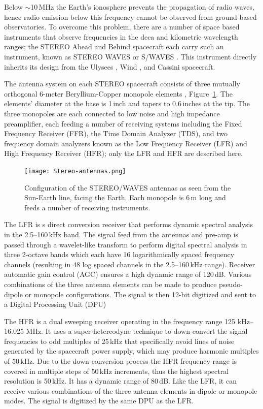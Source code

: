 Below $\sim$10\,MHz the Earth's ionosphere prevents the propagation of radio waves, hence radio emission below this frequency cannot be observed from ground-based observatories. To overcome this problem, there are a number of space based instruments that observe frequencies in the deca and kilometric wavelength ranges; the STEREO Ahead and Behind spacecraft each carry such an instrument, known as STEREO WAVES or S/WAVES \citep{bougeret2008}. This instrument directly inherits its design from the Ulysees \citep{stone1992}, Wind \citep{bougeret1995}, and Cassini \citep{gurnett2004} spacecraft.

The antenna system on each STEREO spacecraft consists of three mutually orthogonal 6-meter Beryllium-Copper monopole elements \citep{bale2008}, Figure~\ref{fig:swaves_antennas}. The elements' diameter at the base is 1\,inch and tapers to 0.6\,inches at the tip. The three monopoles are each connected to low noise and high impedance preamplifier, each feeding a number of receiving systems including the Fixed Frequency Receiver (FFR), the Time Domain Analyzer (TDS), and two frequency domain analyzers known as the Low Frequency Receiver (LFR) and High Frequency Receiver (HFR); only the LFR and HFR are described here.
\begin{figure}[!t]
\begin{center}
\texttt{[image: Stereo-antennas.png]}
\caption[The SWAVES antennas]{Configuration of the STEREO/WAVES antennas as seen from the Sun-Earth line, facing the Earth. Each monopole is 6\,m long and feeds a number of receiving instruments.}
\label{fig:swaves_antennas}
\end{center}
\end{figure}

The LFR is s direct conversion receiver that performs dynamic spectral analysis in the 2.5--160\,kHz band. The signal feed from the antennas and pre-amp is passed through a wavelet-like transform to perform digital spectral analysis in three 2-octave bands which each have 16 logarithmically spaced frequency channels (resulting in 48 log spaced channels in the 2.5--160\,kHz range). Receiver automatic gain control (AGC) ensures a high dynamic range of 120\,dB. Various combinations of the three antenna elements can be made to produce pseudo-dipole or monopole configurations. The signal is then 12-bit digitized and sent to a Digital Processing Unit (DPU)

The HFR is a dual sweeping receiver operating in the frequency range 125 kHz--16.025 MHz. It uses a super-hetereodyne technique to down-convert the signal frequencies to odd multiples of 25\,kHz that specifically avoid lines of noise generated by the spacecraft power supply, which may produce harmonic multiples of 50\,kHz. Due to the down-conversion process the HFR frequency range is covered in multiple steps of 50\,kHz increments, thus the highest spectral resolution is 50\,kHz. It has a dynamic range of 80\,dB. Like the LFR, it can receive various combinations of the three antenna elements in dipole or monopole modes. The signal is digitized by the same DPU as the LFR.


